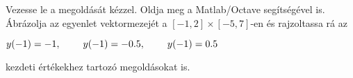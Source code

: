 Vezesse le a 
\de{} megoldását kézzel. 
Oldja meg a Matlab/Octave   segítségével is. 
Ábrázolja az egyenlet vektormezejét a 
$[-1,2]\times [-5,7]$-en és rajzoltassa rá 
az 
\centerline{$y(-1)=-1, \hspace{0.8cm} y(-1)=-0.5, \hspace{0.8cm} y(-1)=0.5$} 
kezdeti értékekhez tartozó megoldásokat is.


